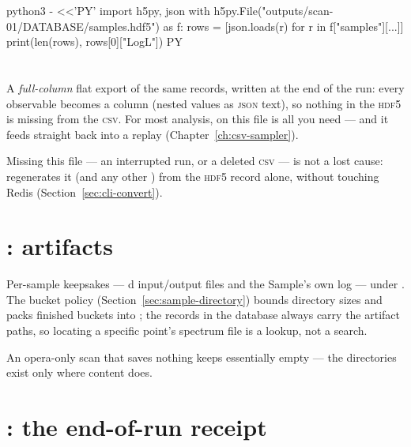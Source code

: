 \begin{terminal}
\begin{jcmd}
python3 - <<'PY'
import h5py, json
with h5py.File("outputs/scan-01/DATABASE/samples.hdf5") as f:
    rows = [json.loads(r) for r in f["samples"][...]]
print(len(rows), rows[0]["LogL"])
PY
\end{jcmd}
\end{terminal}

\section{}
\label{sec:database-csv}

A \emph{full-column} flat export of the same records, written at the end of the run:
every observable becomes a column (nested values as \textsc{json} text), so nothing in
the \textsc{hdf5} is missing from the \textsc{csv}. For most analysis,
 on this file is all you need --- and it feeds straight back
into a  replay (Chapter~\ref{ch:csv-sampler}).

Missing this file --- an interrupted run, or a deleted \textsc{csv} --- is not a lost
cause:  regenerates it (and any other
) from the \textsc{hdf5} record alone, without touching Redis
(Section~\ref{sec:cli-convert}).

\section{: artifacts}
\label{sec:sample-outputs}

Per-sample keepsakes --- d input/output files and the Sample's own log ---
under . The bucket policy
(Section~\ref{sec:sample-directory}) bounds directory sizes and packs finished buckets
into ; the records in the database always carry the artifact
paths, so locating a specific point's spectrum file is a lookup, not a search.

An opera-only scan that saves nothing keeps  essentially empty --- the
directories exist only where content does.

\section{: the end-of-run receipt}
\label{sec:run-summary-file}

